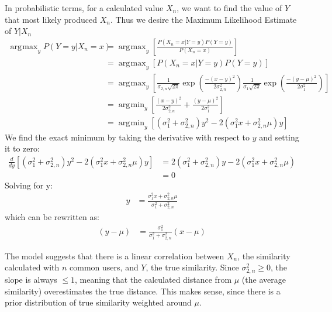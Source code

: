 \documentclass[11pt]{article}
\DeclareMathOperator*{\argmax}{arg\!\max}
\DeclareMathOperator*{\argmin}{arg\!\min}
\begin{document}
In probabilistic terms, for a calculated value $X_n$, we want to find the value
of $Y$ that most likely produced $X_n$. Thus we desire the Maximum Likelihood
Estimate of $Y | X_n$
\begin{align}
\argmax_yP(Y=y|X_n=x) &= \argmax_y\left[\frac{P(X_n=x |
Y=y)P(Y=y)}{P(X_n=x)}\right]
\\&= \argmax_y\left[P(X_n=x|Y=y)P(Y=y)\right]
\\&= 
\argmax_y\left[\frac{1}{\sigma_{2,n}\sqrt{2\pi}}\exp{\left(\frac{-(x-y)^2}
{2\sigma_{2,n}^2}\right)}
\frac{1}{\sigma_{1}\sqrt{2\pi}}\exp{\left(\frac{-(y-\mu)^2}
{2\sigma_{1}^2}\right)}\right]
\\&= \argmin_y\left[\frac{(x-y)^2}{2\sigma_{2,n}^2} +
\frac{(y-\mu)^2}{2\sigma_{1}^2}\right]
\\&= \argmin_y\left[\left(\sigma_{1}^2+\sigma_{2,n}^2\right)y^2 - 
2\left(\sigma_{1}^2x+\sigma_{2,n}^2\mu\right)y\right]
\end{align}
We find the exact minimum by taking the derivative with respect to $y$ and
setting it to zero:
\begin{align}
\frac{d}{dy}\left[\left(\sigma_{1}^2+\sigma_{2,n}^2\right)y^2 - 
2\left(\sigma_{1}^2x+\sigma_{2,n}^2\mu\right)y\right]
&= 2\left(\sigma_{1}^2+\sigma_{2,n}^2\right)y - 
2\left(\sigma_{1}^2x+\sigma_{2,n}^2\mu\right) 
\\&= 0
\end{align}
Solving for y:
\begin{align}
y &= \frac{\sigma_{1}^2x+\sigma_{2,n}^2\mu}{\sigma_{1}^2+\sigma_{2,n}^2}
\end{align}
which can be rewritten as:
\begin{align}
\left(y - \mu\right) &= \frac{\sigma_{1}^2}{\sigma_{1}^2+\sigma_{2,n}^2}
\left(x-\mu\right)
\end{align}

The model suggests that there is a linear correlation between $X_n$, the
similarity calculated with $n$ common users, and $Y$, the true similarity. Since
$\sigma_{2,n}^2\ge0$, the slope is always $\le1$, meaning that the calculated
distance from $\mu$ (the average similarity) overestimates the true distance.
This makes sense, since there is a prior distribution of true similarity
weighted around $\mu$.
\end{document}
